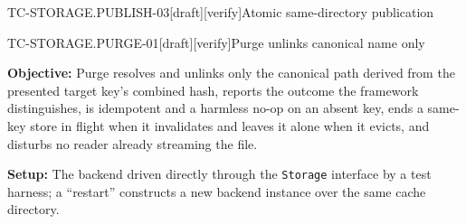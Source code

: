 \begin{requirement}{TC-STORAGE.PUBLISH-03}[draft][verify]{Atomic same-directory publication}


\end{requirement}

\begin{requirement}{TC-STORAGE.PURGE-01}[draft][verify]{Purge unlinks canonical name only}


  \textbf{Objective:} Purge resolves and unlinks only the canonical path
  derived from the presented target key's combined hash, reports the outcome
  the framework distinguishes, is idempotent and a harmless no-op
  on an absent key, ends a same-key store in flight when it invalidates and
  leaves it alone when it evicts, and disturbs no reader already streaming
  the file.

  \textbf{Setup:} The backend driven directly through the \texttt{Storage}
  interface by a test harness; a ``restart'' constructs a new backend instance
  over the same cache directory.


\end{requirement}
